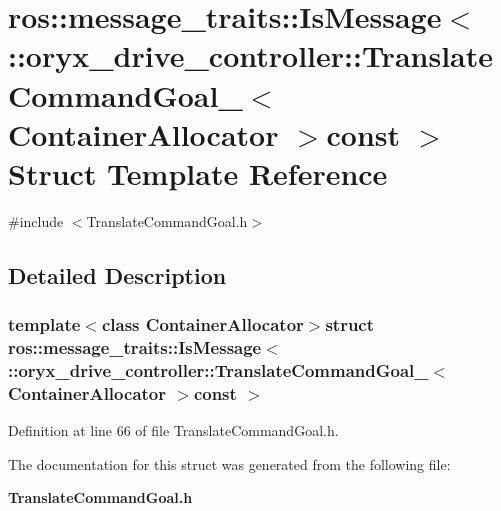 \section{ros\-:\-:message\-\_\-traits\-:\-:\-Is\-Message$<$ \-:\-:oryx\-\_\-drive\-\_\-controller\-:\-:\-Translate\-Command\-Goal\-\_\-$<$ \-Container\-Allocator $>$const $>$ \-Struct \-Template \-Reference}
\label{structros_1_1message__traits_1_1IsMessage_3_01_1_1oryx__drive__controller_1_1TranslateCommandGoac52f188b624e2f9497ded62cac8510f4}


{\ttfamily \#include $<$\-Translate\-Command\-Goal.\-h$>$}



\subsection{\-Detailed \-Description}
\subsubsection*{template$<$class Container\-Allocator$>$struct ros\-::message\-\_\-traits\-::\-Is\-Message$<$ \-::oryx\-\_\-drive\-\_\-controller\-::\-Translate\-Command\-Goal\-\_\-$<$ Container\-Allocator $>$const  $>$}



\-Definition at line 66 of file \-Translate\-Command\-Goal.\-h.



\-The documentation for this struct was generated from the following file\-:\begin{DoxyCompactItemize}
\item 
{\bf \-Translate\-Command\-Goal.\-h}\end{DoxyCompactItemize}
